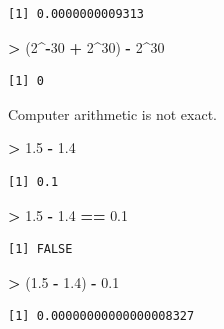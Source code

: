 \documentclass[]{krantz}
\makeatletter
\newenvironment{Shaded}{\begin{snugshade}}{\end{snugshade}}
\newcommand{\DecValTok}[1]{\textcolor[rgb]{0.06,0.06,0.06}{#1}}
\newcommand{\FloatTok}[1]{\textcolor[rgb]{0.06,0.06,0.06}{#1}}
\newcommand{\StringTok}[1]{\textcolor[rgb]{0.5,0.5,0.5}{#1}}
\newcommand{\OperatorTok}[1]{\textcolor[rgb]{0.43,0.43,0.43}{\textbf{#1}}}
\newcommand{\NormalTok}[1]{#1}
\newenvironment{kframe}{%
\medskip{}
\setlength{\fboxsep}{.8em}
 \def\at@end@of@kframe{}%
 \ifinner\ifhmode%
  \def\at@end@of@kframe{\end{minipage}}%
  \begin{minipage}{\columnwidth}%
 \fi\fi%
 \def\FrameCommand##1{\hskip\@totalleftmargin \hskip-\fboxsep
 \colorbox{shadecolor}{##1}\hskip-\fboxsep
     \hskip-\linewidth \hskip-\@totalleftmargin \hskip\columnwidth}%
 \MakeFramed {\advance\hsize-\width
   \@totalleftmargin\z@ \linewidth\hsize
   \@setminipage}}%
 {\par\unskip\endMakeFramed%
 \at@end@of@kframe}
\renewenvironment{Shaded}{\begin{kframe}}{\end{kframe}}
\makeatother
\begin{document}
\begin{verbatim}
[1] 0.0000000009313
\end{verbatim}

\begin{Shaded}
\begin{Highlighting}[]
\OperatorTok{>}\StringTok{ }\NormalTok{(}\DecValTok{2}\OperatorTok{^-}\DecValTok{30} \OperatorTok{+}\StringTok{ }\DecValTok{2}\OperatorTok{^}\DecValTok{30}\NormalTok{) }\OperatorTok{-}\StringTok{ }\DecValTok{2}\OperatorTok{^}\DecValTok{30}
\end{Highlighting}
\end{Shaded}

\begin{verbatim}
[1] 0
\end{verbatim}

Computer arithmetic is not exact.

\begin{Shaded}
\begin{Highlighting}[]
\OperatorTok{>}\StringTok{ }\FloatTok{1.5} \OperatorTok{-}\StringTok{ }\FloatTok{1.4}
\end{Highlighting}
\end{Shaded}

\begin{verbatim}
[1] 0.1
\end{verbatim}

\begin{Shaded}
\begin{Highlighting}[]
\OperatorTok{>}\StringTok{ }\FloatTok{1.5} \OperatorTok{-}\StringTok{ }\FloatTok{1.4} \OperatorTok{==}\StringTok{ }\FloatTok{0.1}
\end{Highlighting}
\end{Shaded}

\begin{verbatim}
[1] FALSE
\end{verbatim}

\begin{Shaded}
\begin{Highlighting}[]
\OperatorTok{>}\StringTok{ }\NormalTok{(}\FloatTok{1.5} \OperatorTok{-}\StringTok{ }\FloatTok{1.4}\NormalTok{) }\OperatorTok{-}\StringTok{ }\FloatTok{0.1}
\end{Highlighting}
\end{Shaded}

\begin{verbatim}
[1] 0.00000000000000008327
\end{verbatim}
\end{document}

